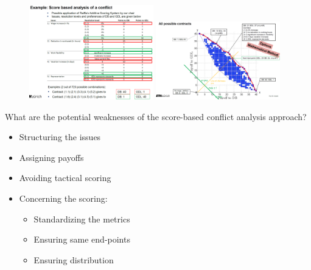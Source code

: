 \begin{figure}[H]
    \centering
    \includegraphics[width=0.48\textwidth]{Pictures/Score_based_analysis_DB.png}
    \hspace{5pt}
    \includegraphics[width=0.48\textwidth]{Pictures/Possible_solutions_DB.png}
\end{figure}

What are the potential weaknesses of the score-based conflict analysis approach?
\begin{itemize}
    \item Structuring the issues
    \item Assigning payoffs
    \item Avoiding tactical scoring
    \item Concerning the scoring:
        \begin{itemize}
            \item Standardizing the metrics
            \item Ensuring same end-points
            \item Ensuring distribution
        \end{itemize}
\end{itemize}

